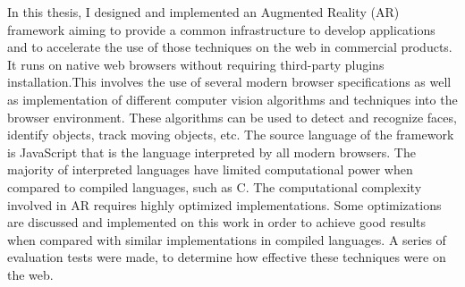 In this thesis, I designed and implemented an Augmented Reality (AR) framework aiming to provide a common infrastructure to develop applications and to accelerate the use of those techniques on the web in commercial products.  It runs on native web browsers without requiring third-party plugins installation.This involves the use of several modern browser specifications as well as implementation of different computer vision algorithms and techniques into the browser environment. These algorithms can be used to detect and recognize faces, identify objects, track moving objects, etc.  The source language of the framework is JavaScript that is the language interpreted by all modern browsers. The majority of interpreted languages have limited computational power when compared to compiled languages, such as C. The computational complexity involved in AR requires highly optimized implementations. Some optimizations are discussed and implemented on this work in order to achieve good results when compared with similar implementations in compiled languages.  A series of evaluation tests were made, to determine how effective these techniques were on the web.


